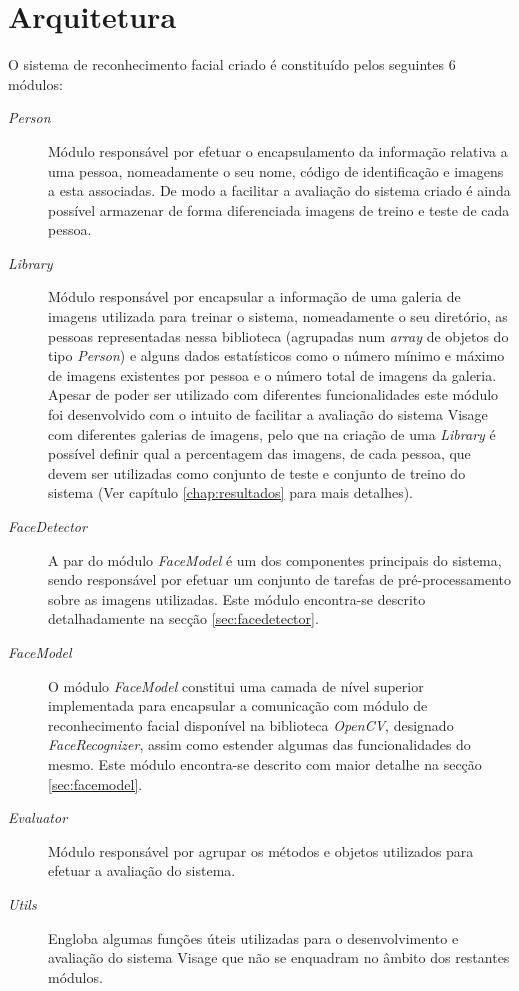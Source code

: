 \section{Arquitetura}
O sistema de reconhecimento facial criado é constituído pelos seguintes 6 módulos:

\begin{description}
\item[\textit{Person}] Módulo responsável por efetuar o encapsulamento da informação relativa a uma pessoa, nomeadamente o seu nome, código de identificação e imagens a esta associadas. De modo a facilitar a avaliação do sistema criado é ainda possível armazenar de forma diferenciada imagens de treino e teste de cada pessoa.
\item[\textit{Library}]Módulo responsável por encapsular a informação de uma galeria de imagens utilizada para treinar o sistema, nomeadamente o seu diretório, as pessoas representadas nessa biblioteca (agrupadas num \textit{array} de objetos do tipo \textit{Person}) e alguns dados estatísticos como o número mínimo e máximo de imagens existentes por pessoa e o número total de imagens da galeria. Apesar de poder ser utilizado com diferentes funcionalidades este módulo foi desenvolvido com o intuito de facilitar a avaliação do sistema Visage com diferentes galerias de imagens, pelo que na criação de uma \textit{Library} é possível definir qual a percentagem das imagens, de cada pessoa, que devem ser utilizadas como conjunto de teste e conjunto de treino do sistema (Ver capítulo \ref{chap:resultados} para mais detalhes).
\item[\textit{FaceDetector}] A par do módulo \textit{FaceModel} é um dos componentes principais do sistema, sendo responsável por efetuar um conjunto de tarefas de pré-processamento sobre as imagens utilizadas. Este módulo encontra-se descrito detalhadamente na secção \ref{sec:facedetector}.
\item[\textit{FaceModel}] 
O módulo \textit{FaceModel} constitui uma camada de nível superior implementada para encapsular a comunicação com módulo de reconhecimento facial disponível na biblioteca \textit{OpenCV}, designado \textit{FaceRecognizer}, assim como estender algumas das funcionalidades do mesmo. Este módulo encontra-se descrito com maior detalhe na secção \ref{sec:facemodel}.
\item[\textit{Evaluator}] Módulo responsável por agrupar os métodos e objetos utilizados para efetuar a avaliação do sistema.
\item[\textit{Utils}] Engloba algumas funções úteis utilizadas para o desenvolvimento e avaliação do sistema Visage que não se enquadram no âmbito dos restantes módulos.
\end{description}

